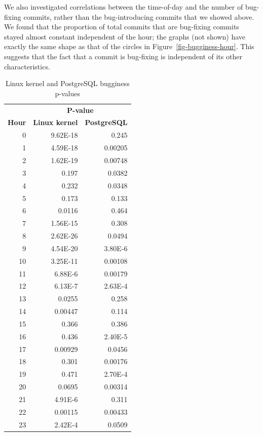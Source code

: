 
We also investigated correlations between the time-of-day and the number of
bug-fixing commits, rather than the bug-introducing commits that we showed
above. We found that the proportion of total commits that are bug-fixing commits
stayed almost constant independent of the hour; the graphs (not shown) have
exactly the same shape as that of the circles in
Figure~\ref{fig-bugginess-hour}.  This suggests that the fact that a commit is
bug-fixing is independent of its other characteristics.

\begin{table}[tbh!]
\begin{center}
\small
\begin{tabular}{r|r|r}
\multicolumn{1}{c}{} & \multicolumn{2}{c}{{\bf P-value}} \\
\multicolumn{1}{c|}{{\bf Hour}} & \multicolumn{1}{c|}{{\bf Linux kernel}} &
\multicolumn{1}{c}{{\bf PostgreSQL}} \\
\hline
0  & 9.62E-18 & 0.245   \\
1  & 4.59E-18 & 0.00205 \\
2  & 1.62E-19 & 0.00748 \\
3  & 0.197    & 0.0382  \\
4  & 0.232    & 0.0348  \\
5  & 0.173    & 0.133   \\
6  & 0.0116   & 0.464   \\
7  & 1.56E-15 & 0.308   \\
8  & 2.62E-26 & 0.0494  \\
9  & 4.54E-20 & 3.80E-6 \\
10 & 3.25E-11 & 0.00108 \\
11 & 6.88E-6  & 0.00179 \\
12 & 6.13E-7  & 2.63E-4 \\
13 & 0.0255   & 0.258   \\
14 & 0.00447  & 0.114   \\
15 & 0.366    & 0.386   \\
16 & 0.436    & 2.40E-5 \\
17 & 0.00929  & 0.0456  \\
18 & 0.301    & 0.00176 \\
19 & 0.471    & 2.70E-4 \\
20 & 0.0695   & 0.00314 \\
21 & 4.91E-6  & 0.311   \\
22 & 0.00115  & 0.00433 \\
23 & 2.42E-4  & 0.0509  \\
\end{tabular}
\end{center}
\caption{\label{tbl-pvalues}Linux kernel and PostgreSQL bugginess p-values}
\end{table}


